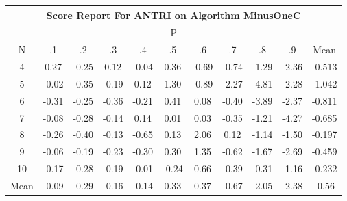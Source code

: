 \documentclass[11pt,a4paper]{report}
\begin{document}
\begin{longtable}{ | c || c | c | c | c | c | c | c | c | c || c |}
\hline
\multicolumn{11}{|c|}{ Score Report For ANTRI on Algorithm MinusOneC} \\
\hline
\multicolumn{11}{|c|}{ P } \\
\hline
N & .1 & .2 & .3 & .4 & .5 & .6 & .7 & .8 & .9 & Mean\\
 \hline
 \hline
 \endhead
  4 &  \cellcolor[HTML]{F7F7FF} 0.27 &  \cellcolor[HTML]{FFF7F7} -0.25 &  \cellcolor[HTML]{FFFFFF} 0.12 &  \cellcolor[HTML]{FFFFFF} -0.04 &  \cellcolor[HTML]{F7F7FF} 0.36 &  \cellcolor[HTML]{FFEFEF} -0.69 &  \cellcolor[HTML]{FFEFEF} -0.74 &  \cellcolor[HTML]{FFDFDF} -1.29 &  \cellcolor[HTML]{FFC7C7} -2.36 & -0.513 \\
  5 &  \cellcolor[HTML]{FFFFFF} -0.02 &  \cellcolor[HTML]{FFF7F7} -0.35 &  \cellcolor[HTML]{FFF7F7} -0.19 &  \cellcolor[HTML]{FFFFFF} 0.12 &  \cellcolor[HTML]{DFDFFF} 1.30 &  \cellcolor[HTML]{FFE7E7} -0.89 &  \cellcolor[HTML]{FFC7C7} -2.27 &  \cellcolor[HTML]{FF8787} -4.81 &  \cellcolor[HTML]{FFC7C7} -2.28 & -1.042 \\
  6 &  \cellcolor[HTML]{FFF7F7} -0.31 &  \cellcolor[HTML]{FFF7F7} -0.25 &  \cellcolor[HTML]{FFF7F7} -0.36 &  \cellcolor[HTML]{FFF7F7} -0.21 &  \cellcolor[HTML]{F7F7FF} 0.41 &  \cellcolor[HTML]{FFFFFF} 0.08 &  \cellcolor[HTML]{FFF7F7} -0.40 &  \cellcolor[HTML]{FF9F9F} -3.89 &  \cellcolor[HTML]{FFC7C7} -2.37 & -0.811 \\
  7 &  \cellcolor[HTML]{FFFFFF} -0.08 &  \cellcolor[HTML]{FFF7F7} -0.28 &  \cellcolor[HTML]{FFFFFF} -0.14 &  \cellcolor[HTML]{FFFFFF} 0.14 &  \cellcolor[HTML]{FFFFFF} 0.01 &  \cellcolor[HTML]{FFFFFF} 0.03 &  \cellcolor[HTML]{FFF7F7} -0.35 &  \cellcolor[HTML]{FFDFDF} -1.21 &  \cellcolor[HTML]{FF9797} -4.27 & -0.685 \\
  8 &  \cellcolor[HTML]{FFF7F7} -0.26 &  \cellcolor[HTML]{FFF7F7} -0.40 &  \cellcolor[HTML]{FFFFFF} -0.13 &  \cellcolor[HTML]{FFEFEF} -0.65 &  \cellcolor[HTML]{FFFFFF} 0.13 &  \cellcolor[HTML]{CFCFFF} 2.06 &  \cellcolor[HTML]{FFFFFF} 0.12 &  \cellcolor[HTML]{FFDFDF} -1.14 &  \cellcolor[HTML]{FFD7D7} -1.50 & -0.197 \\
  9 &  \cellcolor[HTML]{FFFFFF} -0.06 &  \cellcolor[HTML]{FFF7F7} -0.19 &  \cellcolor[HTML]{FFF7F7} -0.23 &  \cellcolor[HTML]{FFF7F7} -0.30 &  \cellcolor[HTML]{F7F7FF} 0.30 &  \cellcolor[HTML]{DFDFFF} 1.35 &  \cellcolor[HTML]{FFEFEF} -0.62 &  \cellcolor[HTML]{FFD7D7} -1.67 &  \cellcolor[HTML]{FFBFBF} -2.69 & -0.459 \\
  10 &  \cellcolor[HTML]{FFF7F7} -0.17 &  \cellcolor[HTML]{FFF7F7} -0.28 &  \cellcolor[HTML]{FFF7F7} -0.19 &  \cellcolor[HTML]{FFFFFF} -0.01 &  \cellcolor[HTML]{FFF7F7} -0.24 &  \cellcolor[HTML]{EFEFFF} 0.66 &  \cellcolor[HTML]{FFF7F7} -0.39 &  \cellcolor[HTML]{FFF7F7} -0.31 &  \cellcolor[HTML]{FFDFDF} -1.16 & -0.232 \\
 \hline
 \hline
Mean &  \cellcolor[HTML]{FFFFFF} -0.09 &  \cellcolor[HTML]{FFF7F7} -0.29 &  \cellcolor[HTML]{FFF7F7} -0.16 &  \cellcolor[HTML]{FFFFFF} -0.14 &  \cellcolor[HTML]{F7F7FF} 0.33 &  \cellcolor[HTML]{F7F7FF} 0.37 &  \cellcolor[HTML]{FFEFEF} -0.67 &  \cellcolor[HTML]{FFCFCF} -2.05 &  \cellcolor[HTML]{FFC7C7} -2.38 &  \cellcolor[HTML]{FFEFEF} -0.56
\end{longtable}
\end{document}
